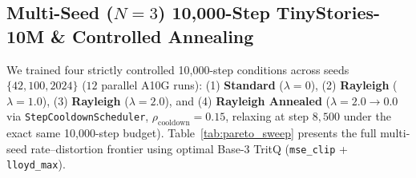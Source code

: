 \documentclass[11pt,a4paper]{article}
\begin{document}
\subsection{Multi-Seed (\texorpdfstring{$N=3$}{N=3}) 10,000-Step TinyStories-10M \& Controlled Annealing}
\label{sec:10k_multiseed}
We trained four strictly controlled 10,000-step conditions across seeds $\{42, 100, 2024\}$ ($12$ parallel A10G runs): (1) \textbf{Standard} ($\lambda = 0$), (2) \textbf{Rayleigh} ($\lambda = 1.0$), (3) \textbf{Rayleigh} ($\lambda = 2.0$), and (4) \textbf{Rayleigh Annealed} ($\lambda = 2.0 \to 0.0$ via \texttt{StepCooldownScheduler}, $\rho_{\text{cooldown}} = 0.15$, relaxing at step $8{,}500$ under the exact same 10,000-step budget). Table~\ref{tab:pareto_sweep} presents the full multi-seed rate--distortion frontier using optimal Base-3 TritQ (\texttt{mse\_clip} + \texttt{lloyd\_max}).

\begin{table}[t]
    \centering
    \small
    \caption{\textbf{Multi-Seed ($N=3$, mean $\pm$ std) 10,000-Step Rate--Distortion Frontier on TinyStories-10M (204.8K val tokens).} Controlled 10k Annealing (\texttt{rayleigh\_anneal2}) strictly Pareto-dominates static regularization across every bit-rate and beats Standard TritQ by $4.04\times$ at $1.638$~bpp and $11.4\times$ at sub-1-bit $0.914$~bpp.}
    \label{tab:pareto_sweep}
\end{table}
\end{document}
